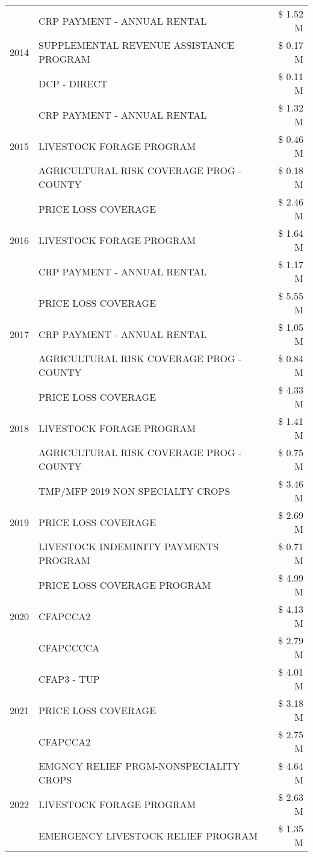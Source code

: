 \begin{tabular}{llr}
\cline{1-3}
\multirow[t]{3}{*}{2014} & CRP PAYMENT - ANNUAL RENTAL & \$ 1.52 M \\
 & SUPPLEMENTAL REVENUE ASSISTANCE PROGRAM & \$ 0.17 M \\
 & DCP - DIRECT & \$ 0.11 M \\
\cline{1-3}
\multirow[t]{3}{*}{2015} & CRP PAYMENT - ANNUAL RENTAL & \$ 1.32 M \\
 & LIVESTOCK FORAGE PROGRAM & \$ 0.46 M \\
 & AGRICULTURAL RISK COVERAGE PROG - COUNTY & \$ 0.18 M \\
\cline{1-3}
\multirow[t]{3}{*}{2016} & PRICE LOSS COVERAGE & \$ 2.46 M \\
 & LIVESTOCK FORAGE PROGRAM & \$ 1.64 M \\
 & CRP PAYMENT - ANNUAL RENTAL & \$ 1.17 M \\
\cline{1-3}
\multirow[t]{3}{*}{2017} & PRICE LOSS COVERAGE & \$ 5.55 M \\
 & CRP PAYMENT - ANNUAL RENTAL & \$ 1.05 M \\
 & AGRICULTURAL RISK COVERAGE PROG - COUNTY & \$ 0.84 M \\
\cline{1-3}
\multirow[t]{3}{*}{2018} & PRICE LOSS COVERAGE & \$ 4.33 M \\
 & LIVESTOCK FORAGE PROGRAM & \$ 1.41 M \\
 & AGRICULTURAL RISK COVERAGE PROG - COUNTY & \$ 0.75 M \\
\cline{1-3}
\multirow[t]{3}{*}{2019} & TMP/MFP 2019 NON SPECIALTY CROPS & \$ 3.46 M \\
 & PRICE LOSS COVERAGE & \$ 2.69 M \\
 & LIVESTOCK INDEMINITY PAYMENTS PROGRAM & \$ 0.71 M \\
\cline{1-3}
\multirow[t]{3}{*}{2020} & PRICE LOSS COVERAGE PROGRAM & \$ 4.99 M \\
 & CFAPCCA2 & \$ 4.13 M \\
 & CFAPCCCCA & \$ 2.79 M \\
\cline{1-3}
\multirow[t]{3}{*}{2021} & CFAP3 - TUP & \$ 4.01 M \\
 & PRICE LOSS COVERAGE & \$ 3.18 M \\
 & CFAPCCA2 & \$ 2.75 M \\
\cline{1-3}
\multirow[t]{3}{*}{2022} & EMGNCY RELIEF PRGM-NONSPECIALITY CROPS & \$ 4.64 M \\
 & LIVESTOCK FORAGE PROGRAM & \$ 2.63 M \\
 & EMERGENCY LIVESTOCK RELIEF PROGRAM & \$ 1.35 M \\
\cline{1-3}
\bottomrule
\end{tabular}
